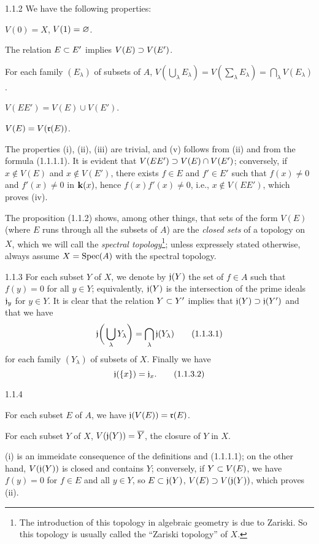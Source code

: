 \documentclass[../main.tex]{subfiles}
\begin{document}
\begin{cx}[Proposition]{1.1.2}
We have the following properties:
\LSI
  \item $V(0)=X$, $V(1)=\varnothing$.
  \item The relation $E\subset E'$ implies $V(E)\supset V(E')$.
  \item For each family $(E_\lambda)$ of subsets of $A$,
  $V(\bigcup_\lambda E_\lambda)=V(\sum_\lambda E_\lambda)=\bigcap_\lambda V(E_\lambda)$.
  \item $V(EE')=V(E)\cup V(E')$.
  \item $V(E)=V(\mathfrak{r}(E))$.
\LE
\end{cx}
The properties (i), (ii), (iii) are trivial, and (v) follows from (ii) and from the
formula (1.1.1.1). It is evident that $V(EE')\supset V(E)\cap V(E')$; conversely, if
$x\not\in V(E)$ and $x\not\in V(E')$, there exists $f\in E$ and $f'\in E'$ such that
$f(x)\neq 0$ and $f'(x)\neq 0$ in $\mathbf{k}(x)$, hence $f(x)f'(x)\neq 0$, i.e., $x\not\in V(EE')$,
which proves (iv).

The proposition (1.1.2) shows, among other things, that sets of the form $V(E)$ (where
$E$ runs through all the subsets of $A$) are the \emph{closed sets} of a topology on
$X$, which we will call the \emph{spectral topology}\footnote{The introduction of this
topology in algebraic geometry is due to Zariski. So this topology is usually called
the ``Zariski topology'' of $X$.}; unless expressely stated otherwise, always assume
$X=\operatorname{Spec}(A)$ with the spectral topology.

\begin{cx}{1.1.3}
For each subset $Y$ of $X$, we denote by $\mathfrak{j}(Y)$ the set of $f\in A$
such that $f(y)=0$ for all $y\in Y$; equivalently, $\mathfrak{j}(Y)$ is the intersection of
the prime ideals $\mathfrak{j}_y$ for $y\in Y$. It is clear that the relation $Y\subset Y'$
implies that $\mathfrak{j}(Y)\supset\mathfrak{j}(Y')$ and that we have
\begin{equation}
  \mathfrak{j}\bigg(\bigcup_\lambda Y_\lambda\bigg)=\bigcap_\lambda\mathfrak{j}(Y_\lambda)\tag{1.1.3.1}
\end{equation}
for each family $(Y_\lambda)$ of subsets of $X$. Finally we have
\begin{equation}
  \mathfrak{j}(\{x\})=\mathfrak{j}_x.\tag{1.1.3.2}
\end{equation}
\end{cx}

\begin{cx}[Proposition]{1.1.4}
\LSI
  \item For each subset $E$ of $A$, we have $\mathfrak{j}(V(E))=\mathfrak{r}(E)$.
  \item For each subset $Y$ of $X$, $V(\mathfrak{j}(Y))=\overline{Y}$, the closure of $Y$ in $X$.
\LE
\end{cx}
(i) is an immeidate consequence of the definitions and (1.1.1.1); on the other hand, $V(\mathfrak{j}(Y))$
is closed and contains $Y$; conversely, if $Y\subset V(E)$, we have $f(y)=0$ for $f\in E$ and all $y\in Y$,
so $E\subset\mathfrak{j}(Y)$, $V(E)\supset V(\mathfrak{j}(Y))$, which proves (ii).
\end{document}
